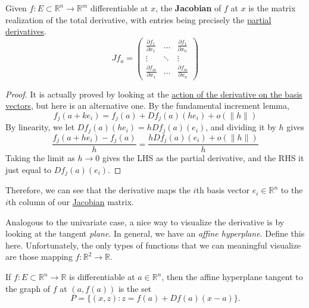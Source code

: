   \begin{definition}[Jacobian]
    \label{def:jacobian}
    Given $f: E \subset \mathbb{R}^n \to \mathbb{R}^m$ differentiable at $x$, the \textbf{Jacobian} of $f$ at $x$ is the matrix realization of the total derivative, with entries being precisely the \hyperref[def:partial-derivative]{partial derivatives}. 
		\begin{equation}
			Jf_a = \begin{pmatrix} 
				\frac{\partial f_1}{\partial x_1} & \ldots & \frac{\partial f_1}{\partial x_n} \\ 
				\vdots & \ddots & \vdots \\ 
				\frac{\partial f_m}{\partial x_1} & \ldots & \frac{\partial f_m}{\partial x_n}
			\end{pmatrix}
		\end{equation}
  \end{definition} 
	\begin{proof}
		It is actually proved by looking at the \hyperref[thm:action-of-derivative-on-basis-vectors]{action of the derivative on the basis vectors}, but here is an alternative one. By the fundamental increment lemma, 
		\begin{equation}
			f_j (a + ke_i) = f_j (a) + Df_j (a) (h e_i) + o(\|h\|)
		\end{equation}
		By linearity, we let $Df_j (a) (h e_i) = h Df_j (a)(e_i)$, and dividing it by $h$ gives 
		\begin{equation}
			\frac{f_j(a + h e_i) - f_j (a)}{h} = \frac{h Df_j (a) (e_i) + o(\|h\|)}{h}
		\end{equation}
		Taking the limit as $h \to 0$ gives the LHS as the partial derivative, and the RHS it just equal to $Df_j (a) (e_i)$. 
	\end{proof}

	Therefore, we can see that the derivative maps the $i$th basis vector $e_i \in \mathbb{R}^n$ to the $i$th column of our \hyperref[def:jacobian]{Jacobian} matrix. 

  Analogous to the univariate case, a nice way to visualize the derivative is by looking at the tangent \textit{plane}. In general, we have an \textit{affine hyperplane}. Define this here. Unfortunately, the only types of functions that we can meaningful visualize are those mapping $f: \mathbb{R}^2 \to \mathbb{R}$. 

	\begin{definition}
	  \label{def:tangent-hyperplane}
		If $f: E \subset \mathbb{R}^n \to \mathbb{R}$ is differentiable at $a\in\mathbb{R}^n$, then the affine hyperplane tangent to the graph of $f$ at $(a,f(a))$ is the set
		\begin{equation}
			P = \{(x, z) \colon z = f(a) + Df(a)(x-a)\}.
		\end{equation}
	\end{definition}

